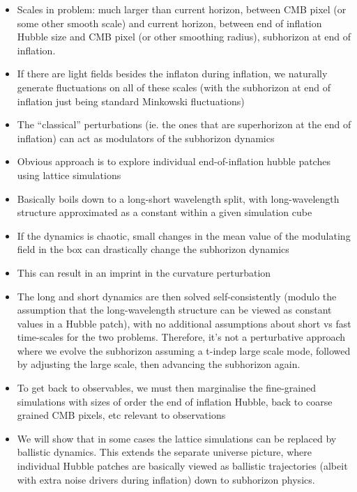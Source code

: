 \begin{itemize}
\item Scales in problem: much larger than current horizon, between CMB pixel (or some other smooth scale) and current horizon, between end of inflation Hubble size and CMB pixel (or other smoothing radius), subhorizon at end of inflation.
\item If there are light fields besides the inflaton during inflation, we naturally generate fluctuations on all of these scales (with the subhorizon at end of inflation just being standard Minkowski fluctuations)
\item The ``classical'' perturbations (ie. the ones that are superhorizon at the end of inflation) can act as modulators of the subhorizon dynamics
\item Obvious approach is to explore individual end-of-inflation hubble patches using lattice simulations
\item Basically boils down to a long-short wavelength split, with long-wavelength structure approximated as a constant within a given simulation cube
\item If the dynamics is chaotic, small changes in the mean value of the modulating field in the box can drastically change the subhorizon dynamics
\item This can result in an imprint in the curvature perturbation
\item The long and short dynamics are then solved self-consistently (modulo the assumption that the long-wavelength structure can be viewed as constant values in a Hubble patch), with no additional assumptions about short vs fast time-scales for the two problems.  Therefore, it's not a perturbative approach where we evolve the subhorizon assuming a t-indep large scale mode, followed by adjusting the large scale, then advancing the subhorizon again.
\item To get back to observables, we must then marginalise the fine-grained simulations with sizes of order the end of inflation Hubble, back to coarse grained CMB pixels, etc relevant to observations
\item We will show that in some cases the lattice simulations can be replaced by ballistic dynamics.  This extends the separate universe picture, where individual Hubble patches are basically viewed as ballistic trajectories (albeit with extra noise drivers during inflation) down to subhorizon physics.
\end{itemize}

